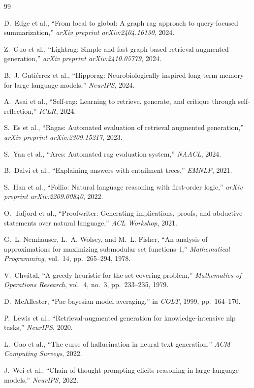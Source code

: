\documentclass[journal,onecolumn,11pt]{IEEEtran}
\begin{document}
\begin{thebibliography}{99}

D.~Edge et al., ``From local to global: A graph rag approach to query-focused summarization,'' \textit{arXiv preprint arXiv:2404.16130}, 2024.

Z.~Guo et al., ``Lightrag: Simple and fast graph-based retrieval-augmented generation,'' \textit{arXiv preprint arXiv:2410.05779}, 2024.

B.~J. Guti\'errez et al., ``Hipporag: Neurobiologically inspired long-term memory for large language models,'' \textit{NeurIPS}, 2024.

A.~Asai et al., ``Self-rag: Learning to retrieve, generate, and critique through self-reflection,'' \textit{ICLR}, 2024.

S.~Es et al., ``Ragas: Automated evaluation of retrieval augmented generation,'' \textit{arXiv preprint arXiv:2309.15217}, 2023.

S.~Yan et al., ``Ares: Automated rag evaluation system,'' \textit{NAACL}, 2024.

B.~Dalvi et al., ``Explaining answers with entailment trees,'' \textit{EMNLP}, 2021.

S.~Han et al., ``Follio: Natural language reasoning with first-order logic,'' \textit{arXiv preprint arXiv:2209.00840}, 2022.

O.~Tafjord et al., ``Proofwriter: Generating implications, proofs, and abductive statements over natural language,'' \textit{ACL Workshop}, 2021.

G.~L. Nemhauser, L.~A. Wolsey, and M.~L. Fisher, ``An analysis of approximations for maximizing submodular set functions--I,'' \textit{Mathematical Programming}, vol.~14, pp.~265--294, 1978.

V.~Chv\'atal, ``A greedy heuristic for the set-covering problem,'' \textit{Mathematics of Operations Research}, vol.~4, no.~3, pp.~233--235, 1979.

D.~McAllester, ``Pac-bayesian model averaging,'' in \textit{COLT}, 1999, pp.~164--170.

P.~Lewis et al., ``Retrieval-augmented generation for knowledge-intensive nlp tasks,'' \textit{NeurIPS}, 2020.

L.~Gao et al., ``The curse of hallucination in neural text generation,'' \textit{ACM Computing Surveys}, 2022.

J.~Wei et al., ``Chain-of-thought prompting elicits reasoning in large language models,'' \textit{NeurIPS}, 2022.

\end{thebibliography}
\end{document}
